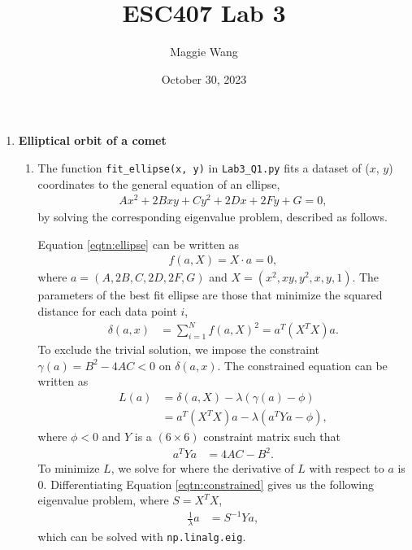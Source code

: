 \documentclass{article}
\newcommand{\code}{\texttt}
\begin{document}
\title{ESC407 Lab 3}

\author{Maggie Wang}

\date{October 30, 2023}
\maketitle

\begin{enumerate}
\item \textbf{Elliptical orbit of a comet}
\begin{enumerate}
    \item
        The function \code{fit\_ellipse(x, y)} in \code{Lab3\_Q1.py} fits a dataset of ($x$, $y$) coordinates to the general equation of an ellipse,
        \begin{align}
            Ax^2+2Bxy+Cy^2+2Dx+2Fy+G=0,  \label{eqtn:ellipse}
        \end{align}
        by solving the corresponding eigenvalue problem, described as follows.\par
        Equation \ref{eqtn:ellipse} can be written as
        \begin{align*}
            f(a, X) = X\cdot a=0,
        \end{align*}
        where $a=(A,2B,C,2D,2F,G)$ and $X=(x^2, xy, y^2, x, y, 1)$. The parameters of the best fit ellipse are those that minimize the squared distance for each data point $i$,
        \begin{align}
            \delta(a, x) &= \sum_{i=1}^N f(a,X)^2 = a^T(X^TX)a. \label{eqtn:sqrt_dist}
        \end{align}
        To exclude the trivial solution, we impose the constraint $\gamma(a) = B^2-4AC < 0$ on $\delta(a, x)$. The constrained equation can be written as
        \begin{align}
            L(a) &= \delta(a,X)-\lambda(\gamma(a)-\phi)\\
                &= a^T(X^T X)a - \lambda(a^TYa-\phi), \label{eqtn:constrained}
        \end{align}
        where $\phi<0$ and $Y$ is a $(6\times 6)$ constraint matrix such that 
        \begin{align}
            a^TYa &= 4AC-B^2. \label{eqtn:ymtx}
        \end{align}
        To minimize $L$, we solve for where the derivative of $L$ with respect to $a$ is 0. 
        Differentiating Equation \ref{eqtn:constrained} gives us the following eigenvalue problem, where $S=X^TX$,
        \begin{align}
            \frac{1}{\lambda}a &= S^{-1}Y a, \label{eqtn:eigval}
        \end{align}
        which can be solved with \code{np.linalg.eig}.


\end{enumerate}
\end{enumerate}
\end{document}
